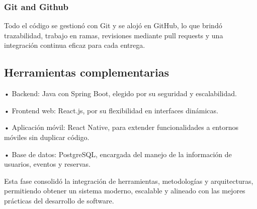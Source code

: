 \subsubsection{Git and Github}
Todo el código se gestionó con Git y se alojó en GitHub, lo que brindó trazabilidad, trabajo en ramas, revisiones mediante pull requests y una integración continua eficaz para cada entrega.

\subsection{Herramientas complementarias}
• Backend: Java con Spring Boot, elegido por su seguridad y escalabilidad.

• Frontend web: React.js, por su flexibilidad en interfaces dinámicas.

• Aplicación móvil: React Native, para extender funcionalidades a entornos móviles sin duplicar código.

• Base de datos: PostgreSQL, encargada del manejo de la información de usuarios, eventos y reservas.

Esta fase consolidó la integración de herramientas, metodologías y arquitecturas, permitiendo obtener un sistema moderno, escalable y alineado con las mejores prácticas del desarrollo de software.